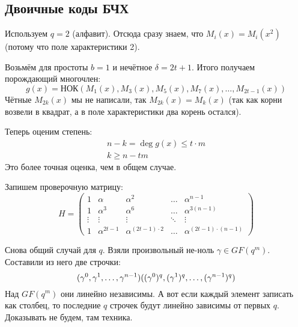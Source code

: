\subsection{Двоичные коды БЧХ}

Используем $q=2$ (алфавит).
Отсюда сразу знаем, что $M_i(x)=M_i(x^2)$ (потому что поле характеристики 2).

Возьмём для простоты $b=1$ и нечётное $\delta=2t+1$.
Итого получаем порождающий многочлен:
\[
g(x) = НОК(M_1(x), M_3(x), M_5(x), M_7(x), \dots, M_{2t-1}(x))
\]
Чётные $M_{2k}(x)$ мы не написали, так $M_{2k}(x)=M_k(x)$ (так как
корни возвели в квадрат, а в поле характеристики два корень остался).

Теперь оценим степень:
\begin{gather*}
n - k = \deg g(x) \le t \cdot m \\
k \ge n - tm
\end{gather*}
Это более точная оценка, чем в общем случае.

Запишем проверочную матрицу:
\[
H = \begin{pmatrix}
1 & \alpha & \alpha^2 & \dots & \alpha^{n-1} \\
1 & \alpha^3 & \alpha^6 & \dots & \alpha^{3(n-1)} \\
\vdots & \vdots & \vdots & \ddots & \vdots \\
1 & \alpha^{2t-1} & \alpha^{(2t-1)\cdot2} & \dots & \alpha^{(2t-1)\cdot(n-1)}
\end{pmatrix}
\]

\begin{lemma}
Снова общий случай для $q$.
Взяли произвольный не-ноль $\gamma \in GF(q^m)$.
Составили из него две строчки:
\[
(\gamma^0, \gamma^1, \dots, \gamma^{n-1}) \\
((\gamma^0)^q, (\gamma^1)^q, \dots, (\gamma^{n-1})^q)
\]
Над $GF(q^m)$ они линейно независимы.
А вот если каждый элемент записать как столбец,
то последние $q$ строчек будут линейно зависимы от первых $q$.
Доказывать не будем, там техника.
\end{lemma}

